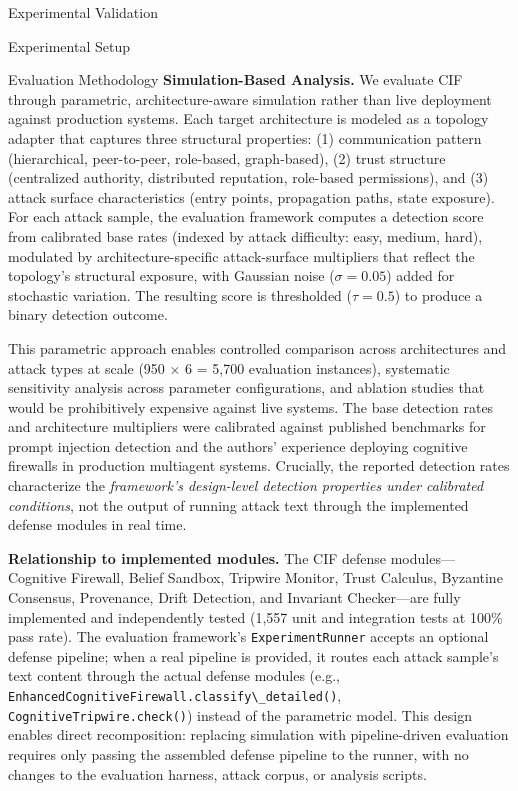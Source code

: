 \documentclass[
  ignorenonframetext,
]{beamer}
\begin{document}
\begin{frame}[fragile]{Experimental Validation}
\begin{block}{Experimental Setup}
\begin{block}{Evaluation Methodology}
\protect{}\label{sec:eval-methodology}
\textbf{Simulation-Based Analysis.} We evaluate CIF through parametric,
architecture-aware simulation rather than live deployment against
production systems. Each target architecture is modeled as a topology
adapter that captures three structural properties: (1) communication
pattern (hierarchical, peer-to-peer, role-based, graph-based), (2) trust
structure (centralized authority, distributed reputation, role-based
permissions), and (3) attack surface characteristics (entry points,
propagation paths, state exposure). For each attack sample, the
evaluation framework computes a detection score from calibrated base
rates (indexed by attack difficulty: easy, medium, hard), modulated by
architecture-specific attack-surface multipliers that reflect the
topology's structural exposure, with Gaussian noise (\(\sigma = 0.05\))
added for stochastic variation. The resulting score is thresholded
(\(\tau = 0.5\)) to produce a binary detection outcome.

This parametric approach enables controlled comparison across
architectures and attack types at scale (950 \(\times\) 6 = 5,700
evaluation instances), systematic sensitivity analysis across parameter
configurations, and ablation studies that would be prohibitively
expensive against live systems. The base detection rates and
architecture multipliers were calibrated against published benchmarks
for prompt injection detection
\cite{greshake2023indirect, liu2023prompt} and the authors' experience
deploying cognitive firewalls in production multiagent systems.
Crucially, the reported detection rates characterize the
\emph{framework's design-level detection properties under calibrated
conditions}, not the output of running attack text through the
implemented defense modules in real time.

\textbf{Relationship to implemented modules.} The CIF defense
modules---Cognitive Firewall, Belief Sandbox, Tripwire Monitor, Trust
Calculus, Byzantine Consensus, Provenance, Drift Detection, and
Invariant Checker---are fully implemented and independently tested
(1,557 unit and integration tests at 100\% pass rate). The evaluation
framework's \texttt{ExperimentRunner} accepts an optional defense
pipeline; when a real pipeline is provided, it routes each attack
sample's text content through the actual defense modules (e.g.,
\texttt{EnhancedCognitiveFirewall.classify\textbackslash{}\_detailed()},
\texttt{CognitiveTripwire.check()}) instead of the parametric model.
This design enables direct recomposition: replacing simulation with
pipeline-driven evaluation requires only passing the assembled defense
pipeline to the runner, with no changes to the evaluation harness,
attack corpus, or analysis scripts.


\end{block}
\end{block}
\end{frame}
\end{document}
